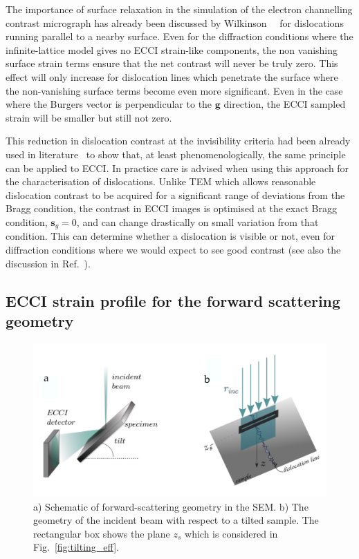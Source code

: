 The importance of surface relaxation in the simulation of the electron channelling contrast micrograph has already been discussed by Wilkinson~\etal~\cite{Wilkinson95} for dislocations running parallel to a nearby surface. Even for the diffraction conditions where the infinite-lattice model gives no ECCI strain-like components, the non vanishing surface strain terms ensure that the net contrast will never be truly zero. This effect will only increase for dislocation lines which penetrate the surface where the non-vanishing surface terms become even more significant. Even in the case where the Burgers vector is perpendicular to the $\mathbf{g}$ direction, the ECCI sampled strain will be smaller but still not zero.

This reduction in dislocation contrast at the invisibility criteria had been already used in literature~\cite{Morin79, Crimp01} to show that, at least phenomenologically, the same principle can be applied to ECCI. In practice care is advised when using this approach for the characterisation of dislocations. Unlike TEM which allows reasonable dislocation contrast to be acquired for a significant range of deviations from the Bragg condition, the contrast in ECCI images is optimised at the exact Bragg condition, $\mathbf{s}_g = 0$, and can change drastically on small variation from that condition. This can determine whether a dislocation is visible or not, even for diffraction conditions where we would expect to see good contrast (see also the discussion in Ref.~\cite{Crimp06}).


\subsection{ECCI strain profile for the forward scattering geometry}
\label{sec:tilteffect}

\begin{figure}[ht]
    \centering
    \includegraphics[width=0.8\linewidth]{Figures/forward_geom.png}
    \caption[Forward-scattering geometry.]{a) Schematic of forward-scattering geometry in the SEM. b) The geometry of the incident beam with respect to a tilted sample. The rectangular box shows the plane $z_s$ which is considered in Fig.~\ref{fig:tilting_eff}.  }
    \label{fig:tilt}
\end{figure}

